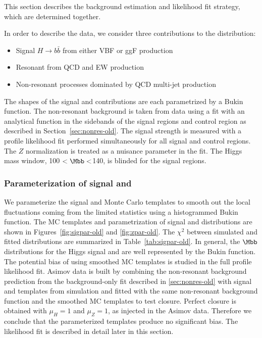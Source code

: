 This section describes the background estimation and likelihood fit strategy, which are determined together.

In order to describe the data, we consider three contributions to the \Mbb{} distribution:  
\begin{itemize}
  \item Signal $H\rightarrow b \bar b$ from either VBF or ggF production
  \item Resonant \zjets{} from QCD and EW production
  \item Non-resonant processes dominated by QCD multi-jet production
\end{itemize}

The shapes of the signal and \zjets{} contributions are each parametrized by a Bukin function. The non-resonant background is taken from data using a fit with an analytical function in the \Mbb{} sidebands of the signal regions and control region as described in Section~\ref{sec:nonres-old}.
The signal strength is measured with a profile likelihood fit performed
simultaneously for all signal and control regions.  The $Z$ normalization is treated as a nuisance parameter in the fit.  The Higgs mass window, 100 \GeV$<\Mbb<$140\GeV, is blinded for the signal regions.  

\subsubsection{Parameterization of signal and \zjets{}}

We parameterize the signal and \zjets{} Monte Carlo templates to smooth out the local fluctuations coming from the limited statistics using a histogrammed Bukin function. The MC templates and parametrization of signal and \zjets{} \Mbb{} distributions are shown in Figures~\ref{fig:sigpar-old} and \ref{fig:zpar-old}. The $\chi^2$ between simulated and fitted distributions are summarized in Table~\ref{tab:sigpar-old}. In general, the $\Mbb$ distributions for the Higgs signal and \zjets{} are well represented by the Bukin function. The potential bias of using smoothed MC templates is studied in the full profile likelihood fit. Asimov data is built by combining the non-resonant background prediction from the background-only fit described in \ref{sec:nonres-old} with signal and \zjets{} templates from simulation and fitted with the same non-resonant background function and the smoothed MC templates to test closure. Perfect closure is obtained with $\mu_{H}=1$ and $\mu_{Z}=1$, as injected in the Asimov data.  Therefore we conclude that the parameterized templates produce no significant bias.  The likelihood fit is described in detail later in this section.

